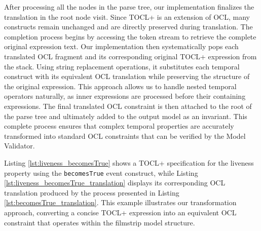 After processing all the nodes in the parse tree, our implementation finalizes the 
translation in the root node visit. Since TOCL+ is an extension of OCL, many 
constructs remain unchanged and are directly preserved during translation. The 
completion process begins by accessing the token stream to retrieve the complete 
original expression text. Our implementation then systematically pops each translated 
OCL fragment and its corresponding original TOCL+ expression from the stack. Using 
string replacement operations, it substitutes each temporal construct with its 
equivalent OCL translation while preserving the structure of the original expression. 
This approach allows us to handle nested temporal operators naturally, as inner 
expressions are processed before their containing expressions. The final translated 
OCL constraint is then attached to the root of the parse tree and ultimately added 
to the output model as an invariant. This complete process ensures that complex 
temporal properties are accurately transformed into standard OCL constraints that 
can be verified by the Model Validator.

Listing \ref{lst:liveness_becomesTrue} shows a TOCL+ specification for the liveness property using the \texttt{becomesTrue} event construct, while Listing \ref{lst:liveness_becomesTrue_translation} displays its corresponding OCL translation produced by the process presented in Listing \ref{lst:becomesTrue_translation}. This example illustrates our transformation approach, converting a concise TOCL+ expression into an equivalent OCL constraint that operates within the filmstrip model structure.

